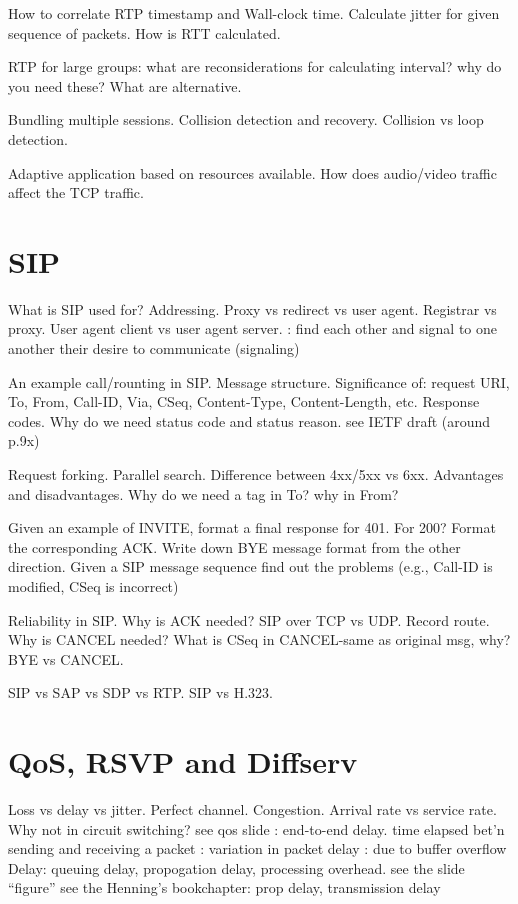 \documentclass{myart}
\begin{document}
\w How to correlate RTP timestamp and Wall-clock time. Calculate
jitter for given sequence of packets. How is RTT calculated.

\w RTP for large groups: what are reconsiderations for calculating
interval? why do you need these? What are alternative.

\w Bundling multiple sessions. Collision detection and
recovery. Collision vs loop detection.

\w Adaptive application based on resources available. How does
audio/video traffic affect the TCP traffic.
\een

\section*{SIP}

\ben
\w What is SIP used for? Addressing. Proxy vs
redirect vs user agent. Registrar vs proxy. User agent client vs user
agent server.
	\bit
	\w {}: find each other and signal to one another
	their desire to communicate (signaling)
	\eit

\w An example call/rounting in SIP. Message structure. Significance
of: request URI, To, From, Call-ID, Via, CSeq, Content-Type,
Content-Length, etc. Response codes. Why do we need status code and status
reason.
	\bit
	\w see IETF draft (around p.9x)
	\eit

\w Request forking. Parallel search. Difference between 4xx/5xx vs
6xx. Advantages and disadvantages. Why do we need a tag in To? why in
From?

\w Given an example of INVITE, format a final response for 401. For
200? Format the corresponding ACK. Write down BYE message format from
the other direction. Given a SIP message sequence find out the
problems (e.g., Call-ID is modified, CSeq is incorrect)

\w Reliability in SIP. Why is ACK needed? SIP over TCP vs UDP. Record
route.  Why is CANCEL needed? What is CSeq in CANCEL-same as original
msg, why? BYE vs CANCEL. 

\w SIP vs SAP vs SDP vs RTP. SIP vs H.323.

\een

\section*{QoS, RSVP and Diffserv}
\ben

\w Loss vs delay vs jitter. Perfect channel. Congestion. Arrival rate vs
service rate.  Why not in circuit switching?
	\bit
	\w see qos slide
	\w {}: end-to-end delay. time elapsed bet'n sending and
	receiving a packet
	\w {}: variation in packet delay
	\w {}: due to buffer overflow
	\eit
\w Delay: queuing delay, propogation delay, processing overhead.
	\bit
	\w see the slide ``figure''
	\w see the Henning's bookchapter: prop delay, transmission delay
	\eit
\end{document}
